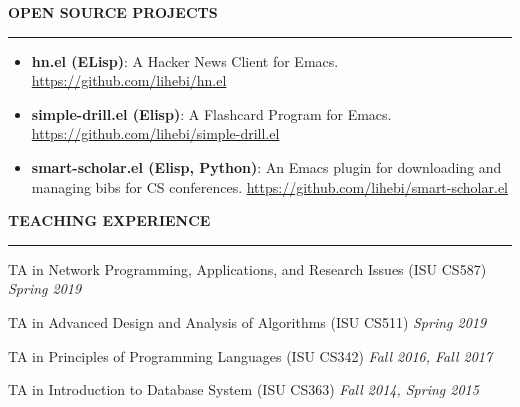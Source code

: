 \documentclass[10pt,letterpaper]{article}
\newenvironment{mysection}[1]{ %
  \medskip
  \MakeUppercase{\bf #1}
  \medskip
  \hrule
  \begin{list}{}{
      \setlength{\leftmargin}{1.5em}
    }
  \item[]
}{
  \end{list}
}
\begin{document}
\begin{mysection}{Open Source Projects}
  \begin{itemize}
  \item \textbf{hn.el (ELisp)}: A Hacker News Client for Emacs.
    \url{https://github.com/lihebi/hn.el}
  \item \textbf{simple-drill.el (Elisp)}: A Flashcard Program for
    Emacs. \url{https://github.com/lihebi/simple-drill.el}
  \item \textbf{smart-scholar.el (Elisp, Python)}: An Emacs plugin for
    downloading and managing bibs for CS conferences.
    \url{https://github.com/lihebi/smart-scholar.el}
  \end{itemize}
\end{mysection}

\begin{mysection}{Teaching Experience}
  TA in Network Programming, Applications, and Research Issues (ISU CS587)
  \hfill \emph{Spring 2019}
  
  TA in Advanced Design and Analysis of Algorithms (ISU CS511)
  \hfill \emph{Spring 2019}
  
  TA in Principles of Programming Languages (ISU CS342)
  \hfill \emph{Fall 2016, Fall 2017}

  TA in Introduction to Database System (ISU CS363)
  \hfill \emph{Fall 2014, Spring 2015}
\end{mysection}

\end{document}
